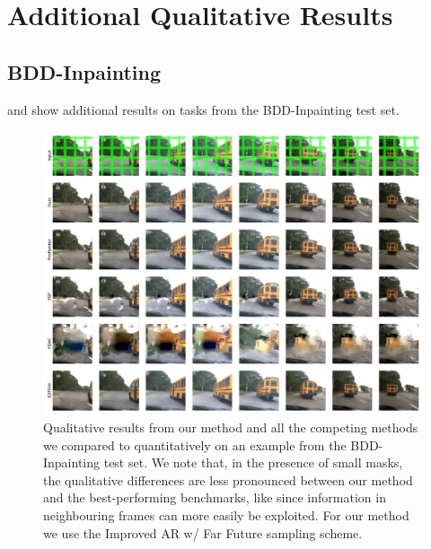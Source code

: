 \chapter{Additional Qualitative Results}
\section{BDD-Inpainting}
 and  show additional results on tasks from the BDD-Inpainting test set. 
\begin{figure}[h]
\begin{center}
    \centering
    \captionsetup{type=figure}
    \includegraphics[width=\linewidth]{figures/additional-samples/bus_all.pdf}
    \caption[Qualitative results from our method and all competing methods on an example from the BDD-Inpainting-Blobs test set.]{Qualitative results from our method and all the competing methods we compared to quantitatively on an example from the BDD-Inpainting test set. We note that, in the presence of small masks, the qualitative differences are less pronounced between our method and the best-performing benchmarks, like since information in neighbouring frames can more easily be exploited. For our method we use the Improved AR w/ Far Future sampling scheme.}
    \label{fig:bus}
\end{center}
\end{figure}



